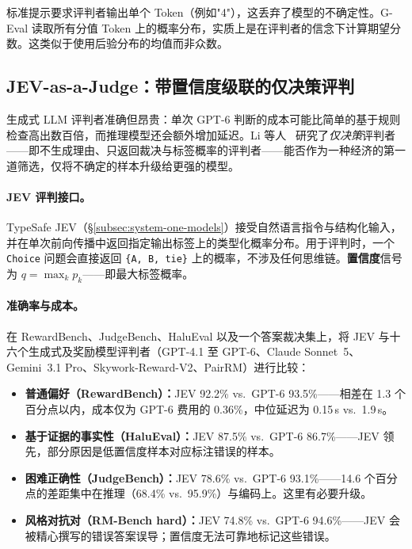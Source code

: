 \begin{intuitionbox}[为何 G-Eval 有效]
标准提示要求评判者输出单个 Token（例如"4"），这丢弃了模型的不确定性。G-Eval 读取所有分值 Token 上的概率分布，实质上是在评判者的信念下计算期望分数。这类似于使用后验分布的均值而非众数。
\end{intuitionbox}

\subsection{JEV-as-a-Judge：带置信度级联的仅决策评判}
\label{subsec:jev-as-a-judge}

生成式 LLM 评判者准确但昂贵：单次 GPT-6 判断的成本可能比简单的基于规则检查高出数百倍，而推理模型还会额外增加延迟。Li 等人~\cite{li2026jevjudge} 研究了\emph{仅决策}评判者——即不生成理由、只返回裁决与标签概率的评判者——能否作为一种经济的第一道筛选，仅将不确定的样本升级给更强的模型。

\paragraph{JEV 评判接口。}
TypeSafe JEV（§\ref{subsec:system-one-models}）接受自然语言指令与结构化输入，并在单次前向传播中返回指定输出标签上的类型化概率分布。用于评判时，一个 \texttt{Choice} 问题会直接返回 \texttt{\{A, B, tie\}} 上的概率，不涉及任何思维链。\textbf{置信度}信号为 $q = \max_k p_k$——即最大标签概率。

\paragraph{准确率与成本。}
在 RewardBench、JudgeBench、HaluEval 以及一个答案裁决集上，将 JEV 与十六个生成式及奖励模型评判者（GPT-4.1 至 GPT-6、Claude Sonnet~5、Gemini~3.1 Pro、Skywork-Reward-V2、PairRM）进行比较：

\begin{itemize}
  \item \textbf{普通偏好（RewardBench）：}JEV 92.2\% vs.\ GPT-6 93.5\%——相差在 1.3 个百分点以内，成本仅为 GPT-6 费用的 0.36\%，中位延迟为 0.15\,s vs.\ 1.9\,s。
  \item \textbf{基于证据的事实性（HaluEval）：}JEV 87.5\% vs.\ GPT-6 86.7\%——JEV 领先，部分原因是低置信度样本对应标注错误的样本。
  \item \textbf{困难正确性（JudgeBench）：}JEV 78.6\% vs.\ GPT-6 93.1\%——14.6 个百分点的差距集中在推理（68.4\% vs.\ 95.9\%）与编码上。这里有必要升级。
  \item \textbf{风格对抗对（RM-Bench hard）：}JEV 74.8\% vs.\ GPT-6 94.6\%——JEV 会被精心撰写的错误答案误导；置信度无法可靠地标记这些错误。
\end{itemize}

